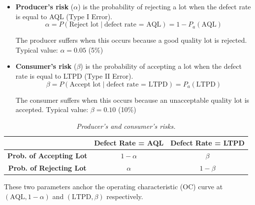 \documentclass[twoside]{book}
\begin{document}
\begin{itemize}
\item \textbf{Producer's risk} ($\alpha$) is the probability of rejecting a lot when the defect rate is equal to AQL (Type I Error).
$$\alpha = P(\text{Reject lot} \mid \text{defect rate = AQL}) = 1 - P_a(\text{AQL})$$

The producer suffers when this occurs because a good quality lot is rejected. {Typical value:} $\alpha = 0.05$ (5\%)

\medskip

\item \textbf{Consumer's risk} ($\beta$) is the probability of accepting a lot when the defect rate is equal to LTPD (Type II Error).
$$\beta = P(\text{Accept lot} \mid \text{defect rate = LTPD}) = P_a(\text{LTPD})$$

The consumer suffers when this occurs because an unacceptable quality lot is accepted. {Typical value:} $\beta = 0.10$ (10\%)
\end{itemize}

\begin{table}[H]
\centering
\begin{tabular}{c|c|c}
\toprule
& \textbf{Defect Rate = AQL} & \textbf{Defect Rate = LTPD} \\
\midrule
\textbf{Prob. of Accepting Lot} & $1-\alpha$ & $\beta$ \\
\midrule
\textbf{Prob. of Rejecting Lot} & $\alpha$ & $1-\beta$ \\
\bottomrule
\end{tabular}
\caption{\textit{Producer's and consumer's risks.}}
\end{table}

These two parameters anchor the operating characteristic (OC) curve at \((\text{AQL}, 1-\alpha)\) and \((\text{LTPD}, \beta)\) respectively.
\end{document}
